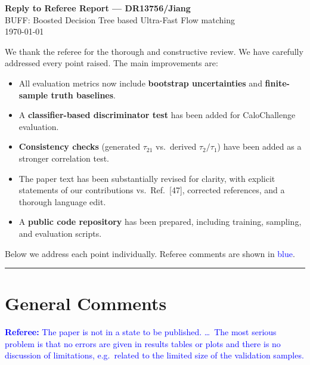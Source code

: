 \documentclass[11pt]{article}
\newcommand{\refcomment}[1]{\textcolor{blue}{\textbf{Referee:} #1}}
\begin{document}
\begin{center}
{\Large \textbf{Reply to Referee Report --- DR13756/Jiang}}\\[6pt]
{\large BUFF: Boosted Decision Tree based Ultra-Fast Flow matching}\\[6pt]
\today
\end{center}

\bigskip

We thank the referee for the thorough and constructive review. We have carefully addressed every point raised. The main improvements are:
\begin{itemize}
    \item All evaluation metrics now include \textbf{bootstrap uncertainties} and \textbf{finite-sample truth baselines}.
    \item A \textbf{classifier-based discriminator test} has been added for CaloChallenge evaluation.
    \item \textbf{Consistency checks} (generated $\tau_{21}$ vs.\ derived $\tau_2/\tau_1$) have been added as a stronger correlation test.
    \item The paper text has been substantially revised for clarity, with explicit statements of our contributions vs.\ Ref.~[47], corrected references, and a thorough language edit.
    \item A \textbf{public code repository} has been prepared, including training, sampling, and evaluation scripts.
\end{itemize}

Below we address each point individually. Referee comments are shown in \textcolor{blue}{blue}.

\bigskip
\hrule
\bigskip

\section*{General Comments}

\refcomment{The paper is not in a state to be published. \ldots\ The most serious problem is that no errors are given in results tables or plots and there is no discussion of limitations, e.g.\ related to the limited size of the validation samples.}
\end{document}
